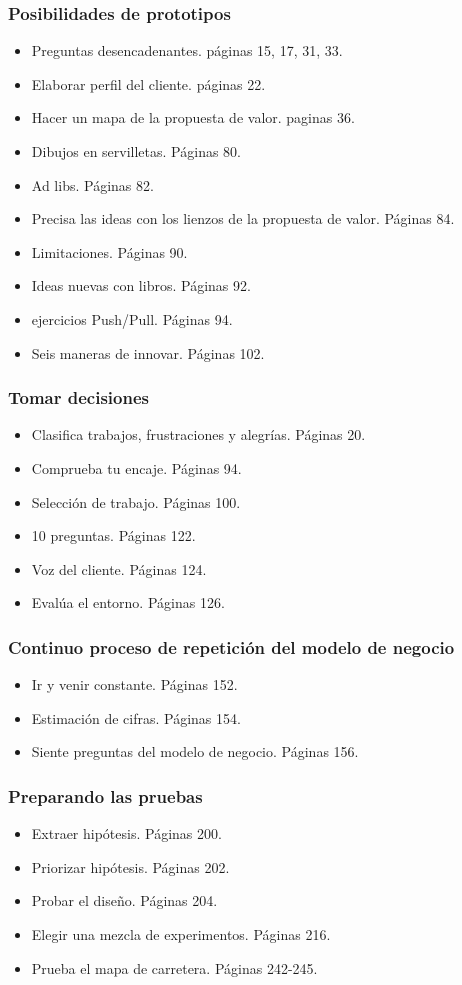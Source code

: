 \documentclass[11pt]{book}
\begin{document}
\subsubsection{Posibilidades de prototipos}
\begin{itemize}
\item Preguntas desencadenantes. páginas 15, 17, 31, 33.
\item Elaborar perfil del cliente. páginas 22.
\item Hacer un mapa de la propuesta de valor. paginas 36.
\item Dibujos en servilletas. Páginas 80.
\item Ad libs. Páginas 82.
\item Precisa las ideas con los lienzos de la propuesta de valor. Páginas 84.
\item Limitaciones. Páginas 90.
\item Ideas nuevas con libros. Páginas 92.
\item ejercicios Push/Pull. Páginas 94.
\item Seis maneras de innovar. Páginas 102. 
\end{itemize}
\subsubsection{Tomar decisiones}
\begin{itemize}
\item Clasifica trabajos, frustraciones y alegrías. Páginas 20.
\item Comprueba tu encaje. Páginas 94.
\item Selección de trabajo. Páginas 100.
\item 10 preguntas. Páginas 122.
\item Voz del cliente. Páginas 124.
\item Evalúa el entorno. Páginas 126. 
\end{itemize}
\subsubsection{Continuo proceso de repetición del modelo de negocio}
\begin{itemize}
\item Ir y venir constante. Páginas 152.
\item Estimación de cifras. Páginas 154.
\item Siente preguntas del modelo de negocio. Páginas 156. 
\end{itemize}
\subsubsection{Preparando las pruebas}
\begin{itemize}
\item Extraer hipótesis. Páginas 200.
\item Priorizar hipótesis. Páginas 202.
\item Probar el diseño. Páginas 204.
\item Elegir una mezcla de experimentos. Páginas 216.
\item Prueba el mapa de carretera. Páginas 242-245.
\end{itemize}
\end{document}
